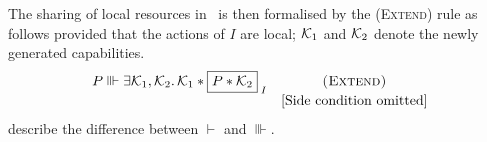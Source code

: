 The sharing of local resources in \colosl\ is then formalised by the \textsc{(Extend)} rule as follows provided that the actions of $I$ are local; $\mathcal{K}_{1}$ and $\mathcal{K}_{2}$ denote the newly generated capabilities.
%
\[
\begin{array}{l c}
	P \sentails \exsts{\capAss{1}, \capAss{2}} \capAss{1} * \shared{P * \capAss{2}}{I} & \textsc{(Extend)}\\
	& \text{[Side condition omitted]}
\end{array}
\]
%
\todo describe the difference between $\vdash$ and $\Vvdash$.\\
%

